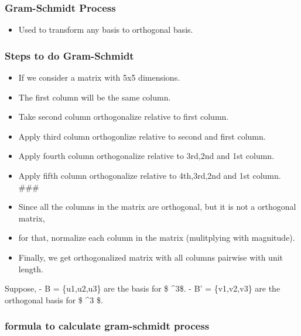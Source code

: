 \documentclass[11pt]{article}
\providecommand{\tightlist}{%
      \setlength{\itemsep}{0pt}\setlength{\parskip}{0pt}}
\begin{document}
    \hypertarget{gram-schmidt-process}{%
\subsubsection{\texorpdfstring{\textbf{Gram-Schmidt
Process}}{Gram-Schmidt Process}}\label{gram-schmidt-process}}

    \begin{itemize}
\tightlist
\item
  Used to transform any basis to orthogonal basis.
\end{itemize}

\hypertarget{steps-to-do-gram-schmidt}{%
\subsubsection{Steps to do
Gram-Schmidt}\label{steps-to-do-gram-schmidt}}

\begin{itemize}
\tightlist
\item
  If we consider a matrix with 5x5 dimensions.
\item
  The first column will be the same column.
\item
  Take second column orthogonalize relative to first column.
\item
  Apply third column orthogonlize relative to second and first column.
\item
  Apply fourth column orthogonalize relative to 3rd,2nd and 1st column.
\item
  Apply fifth column orthogonalize relative to 4th,3rd,2nd and 1st
  column. \#\#\#
\item
  Since all the columns in the matrix are orthogonal, but it is not a
  orthogonal matrix,
\item
  for that, normalize each column in the matrix (mulitplying with
  magnitude).
\item
  Finally, we get orthogonalized matrix with all columns pairwise with
  unit length.
\end{itemize}

    

    Suppose, - B = \{u1,u2,u3\} are the basis for \$ \^{}3\$. - B'
= \{v1,v2,v3\} are the orthogonal basis for \$ \^{}3 \$.

    \hypertarget{formula-to-calculate-gram-schmidt-process}{%
\subsubsection{formula to calculate gram-schmidt
process}\label{formula-to-calculate-gram-schmidt-process}}
\end{document}
